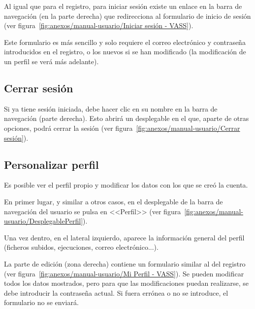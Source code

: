 Al igual que para el registro, para iniciar sesión existe un enlace en la barra
de navegación (en la parte derecha) que redirecciona al formulario de inicio de
sesión (ver
figura~\ref{fig:anexos/manual-usuario/Iniciar sesión - VASS}).


Este formulario es más sencillo y solo requiere el correo electrónico y
contraseña introducidos en el registro, o los nuevos si se han modificado (la
modificación de un perfil se verá más adelante).

\subsection{Cerrar sesión}

Si ya tiene sesión iniciada, debe hacer clic en su nombre en la barra de
navegación (parte derecha). Esto abrirá un desplegable en el que, aparte de
otras opciones, podrá cerrar la sesión (ver
figura~\ref{fig:anexos/manual-usuario/Cerrar sesión}).


\subsection{Personalizar perfil}

Es posible ver el perfil propio y modificar los datos con los que se creó la
cuenta.

En primer lugar, y similar a otros casos, en el desplegable de la barra de
navegación del usuario se pulsa en <<Perfil>> (ver
figura~\ref{fig:anexos/manual-usuario/DesplegablePerfil}).


Una vez dentro, en el lateral izquierdo, aparece la información general del
perfil (ficheros subidos, ejecuciones, correo electrónico...).

La parte de edición (zona derecha) contiene un formulario similar al del
registro (ver figura~\ref{fig:anexos/manual-usuario/Mi Perfil - VASS}). Se
pueden modificar todos los datos mostrados, pero para que las modificaciones
puedan realizarse, se debe introducir la contraseña actual. Si fuera errónea o
no se introduce, el formulario no se enviará.


